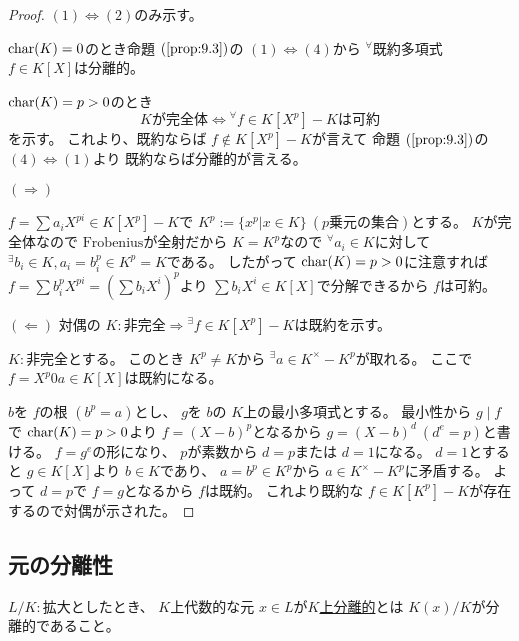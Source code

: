 \documentclass[../master_galois_theory]{subfiles}
\begin{document}
\begin{proof}
  $(1) \Leftrightarrow (2)$のみ示す。

  $\mathrm{char}(K) = 0$のとき命題 $(\mathrm{\ref{prop:9.3}})$の
  $(1) \Leftrightarrow (4)$から ${}^\forall$既約多項式 $f \in K[X]$は分離的。

  $\mathrm{char}(K) = p > 0$のとき
  \[
  Kが完全体 \Leftrightarrow {}^\forall f \in K[X^p] - K は可約
  \]
  を示す。
  これより、既約ならば $f \notin K[X^p] - K$が言えて
  命題 $(\mathrm{\ref{prop:9.3}})$の $(4) \Leftrightarrow (1)$より
  既約ならば分離的が言える。

  $(\Rightarrow)$

  $f = \sum a_i X^{pi} \in K[X^p] - K$で
  $K^p := \{ x^p | x \in K \} \  (p乗元の集合)$とする。
  $K$が完全体なので $\mathrm{Frobenius}$が全射だから
  $K = K^p$なので ${}^\forall a_i \in K$に対して
  ${}^\exists b_i \in K , a_i = b_i^p \in K^p = K$である。
  したがって $\mathrm{char}(K) = p > 0$に注意すれば
  $f = \sum b_i^p X^{pi} = (\sum b_i X^i)^p$より
  $\sum b_i X^i \in K[X]$で分解できるから $f$は可約。

  $(\Leftarrow)$
  対偶の $K:非完全 \Rightarrow {}^\exists f \in K[X^p] - K は既約$を示す。

  $K:$非完全とする。
  このとき $K^p \neq K$から ${}^\exists a \in K^\times - K^p$が取れる。
  ここで $f = X^p 0 a \in K[X]$は既約になる。

  $b$を $f$の根 $(b^p = a)$とし、
  $g$を $b$の $K$上の最小多項式とする。
  最小性から $g \mid f$で $\mathrm{char}(K) = p > 0$より
  $f = (X - b)^p$となるから
  $g = (X - b)^d \  (d^e = p)$と書ける。
  $f = g^e$の形になり、 $p$が素数から
  $d = p$または $d = 1$になる。
  $d = 1$とすると $g \in K[X]$より $b \in K$であり、 $a = b^p \in K^p$から
  $a \in K^\times - K^p$に矛盾する。
  よって $d = p$で $f = g$となるから $f$は既約。
  これより既約な $f \in K[K^p] - K$が存在するので対偶が示された。
\end{proof}

\subsection{元の分離性}

\begin{defi}
  $L/K:$拡大としたとき、
  $K$上代数的な元 $x \in L$が\underline{$K$上分離的}とは
  $K(x)/K$が分離的であること。
\end{defi}
\end{document}
